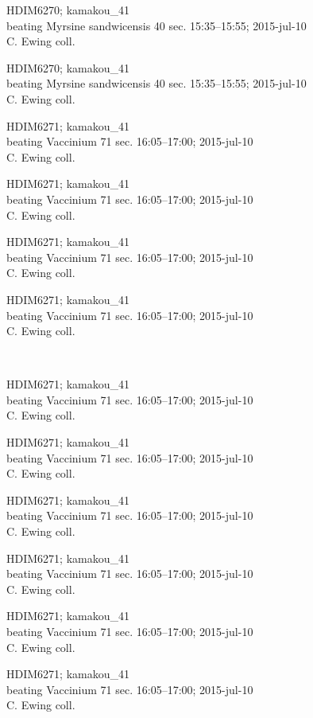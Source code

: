 \documentclass[2pt]{extarticle}
\begin{document}
\noindent
\parbox{0.16\textwidth}{\tiny \raggedright \rule[-0.3\baselineskip]{0pt}{10pt}HDIM6270; kamakou\_41\\ beating Myrsine sandwicensis 40 sec. 15:35--15:55; 2015-jul-10\\ C. Ewing coll.}
\parbox{0.16\textwidth}{\tiny \raggedright \rule[-0.3\baselineskip]{0pt}{10pt}HDIM6270; kamakou\_41\\ beating Myrsine sandwicensis 40 sec. 15:35--15:55; 2015-jul-10\\ C. Ewing coll.}
\parbox{0.16\textwidth}{\tiny \raggedright \rule[-0.3\baselineskip]{0pt}{10pt}HDIM6271; kamakou\_41\\ beating Vaccinium 71 sec. 16:05--17:00; 2015-jul-10\\ C. Ewing coll.}
\parbox{0.16\textwidth}{\tiny \raggedright \rule[-0.3\baselineskip]{0pt}{10pt}HDIM6271; kamakou\_41\\ beating Vaccinium 71 sec. 16:05--17:00; 2015-jul-10\\ C. Ewing coll.}
\parbox{0.16\textwidth}{\tiny \raggedright \rule[-0.3\baselineskip]{0pt}{10pt}HDIM6271; kamakou\_41\\ beating Vaccinium 71 sec. 16:05--17:00; 2015-jul-10\\ C. Ewing coll.}
\parbox{0.16\textwidth}{\tiny \raggedright \rule[-0.3\baselineskip]{0pt}{10pt}HDIM6271; kamakou\_41\\ beating Vaccinium 71 sec. 16:05--17:00; 2015-jul-10\\ C. Ewing coll.} \\ 
\vspace{0.001in} 

\noindent
\parbox{0.16\textwidth}{\tiny \raggedright \rule[-0.3\baselineskip]{0pt}{10pt}HDIM6271; kamakou\_41\\ beating Vaccinium 71 sec. 16:05--17:00; 2015-jul-10\\ C. Ewing coll.}
\parbox{0.16\textwidth}{\tiny \raggedright \rule[-0.3\baselineskip]{0pt}{10pt}HDIM6271; kamakou\_41\\ beating Vaccinium 71 sec. 16:05--17:00; 2015-jul-10\\ C. Ewing coll.}
\parbox{0.16\textwidth}{\tiny \raggedright \rule[-0.3\baselineskip]{0pt}{10pt}HDIM6271; kamakou\_41\\ beating Vaccinium 71 sec. 16:05--17:00; 2015-jul-10\\ C. Ewing coll.}
\parbox{0.16\textwidth}{\tiny \raggedright \rule[-0.3\baselineskip]{0pt}{10pt}HDIM6271; kamakou\_41\\ beating Vaccinium 71 sec. 16:05--17:00; 2015-jul-10\\ C. Ewing coll.}
\parbox{0.16\textwidth}{\tiny \raggedright \rule[-0.3\baselineskip]{0pt}{10pt}HDIM6271; kamakou\_41\\ beating Vaccinium 71 sec. 16:05--17:00; 2015-jul-10\\ C. Ewing coll.}
\parbox{0.16\textwidth}{\tiny \raggedright \rule[-0.3\baselineskip]{0pt}{10pt}HDIM6271; kamakou\_41\\ beating Vaccinium 71 sec. 16:05--17:00; 2015-jul-10\\ C. Ewing coll.} \\ 
\vspace{0.001in} 
\end{document}
